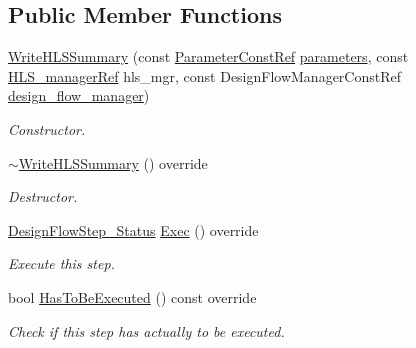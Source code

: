 \subsection*{Public Member Functions}
\begin{DoxyCompactItemize}
\item 
\hyperlink{classWriteHLSSummary_a7de3ea8d1f25c14e5fe9248377e4b408}{Write\+H\+L\+S\+Summary} (const \hyperlink{Parameter_8hpp_a37841774a6fcb479b597fdf8955eb4ea}{Parameter\+Const\+Ref} \hyperlink{classDesignFlowStep_a802eaafe8013df706370679d1a436949}{parameters}, const \hyperlink{hls__manager_8hpp_acd3842b8589fe52c08fc0b2fcc813bfe}{H\+L\+S\+\_\+manager\+Ref} hls\+\_\+mgr, const Design\+Flow\+Manager\+Const\+Ref \hyperlink{classDesignFlowStep_ab770677ddf087613add30024e16a5554}{design\+\_\+flow\+\_\+manager})
\begin{DoxyCompactList}\small\item\em Constructor. \end{DoxyCompactList}\item 
\hyperlink{classWriteHLSSummary_ab8c4f4a9073b7911180943c29a217e79}{$\sim$\+Write\+H\+L\+S\+Summary} () override
\begin{DoxyCompactList}\small\item\em Destructor. \end{DoxyCompactList}\item 
\hyperlink{design__flow__step_8hpp_afb1f0d73069c26076b8d31dbc8ebecdf}{Design\+Flow\+Step\+\_\+\+Status} \hyperlink{classWriteHLSSummary_ab846705e6c5c2b406578e5bf2a62ec2d}{Exec} () override
\begin{DoxyCompactList}\small\item\em Execute this step. \end{DoxyCompactList}\item 
bool \hyperlink{classWriteHLSSummary_ac901ee249803853d6cecec187c530fff}{Has\+To\+Be\+Executed} () const override
\begin{DoxyCompactList}\small\item\em Check if this step has actually to be executed. \end{DoxyCompactList}\end{DoxyCompactItemize}
